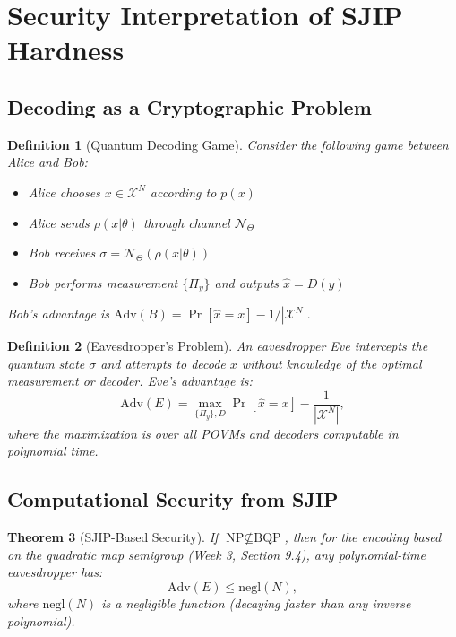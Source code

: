 \documentclass[12pt]{article}
\newtheorem{theorem}{Theorem}[section]
\newtheorem{definition}[theorem]{Definition}
\newcommand{\calN}{\mathcal{N}}
\begin{document}
\section{Security Interpretation of SJIP Hardness}

\subsection{Decoding as a Cryptographic Problem}

\begin{definition}[Quantum Decoding Game]
Consider the following game between Alice and Bob:
\begin{itemize}
    \item Alice chooses \(x \in \mathcal{X}^N\) according to \(p(x)\)
    \item Alice sends \(\rho(x|\theta)\) through channel \(\calN_\Theta\)
    \item Bob receives \(\sigma = \calN_\Theta(\rho(x|\theta))\)
    \item Bob performs measurement \(\{\Pi_y\}\) and outputs \(\hat{x} = D(y)\)
\end{itemize}
Bob's advantage is \(\text{Adv}(B) = \Pr[\hat{x}=x] - 1/|\mathcal{X}^N|\).
\end{definition}

\begin{definition}[Eavesdropper's Problem]
An eavesdropper Eve intercepts the quantum state \(\sigma\) and attempts to decode \(x\) without knowledge of the optimal measurement or decoder. Eve's advantage is:
\begin{equation}
    \text{Adv}(E) = \max_{\{\Pi_y\}, D} \Pr[\hat{x}=x] - \frac{1}{|\mathcal{X}^N|},
\end{equation}
where the maximization is over all POVMs and decoders computable in polynomial time.
\end{definition}

\subsection{Computational Security from SJIP}

\begin{theorem}[SJIP-Based Security]
If \(\text{NP} \nsubseteq \text{BQP}\), then for the encoding based on the quadratic map semigroup (Week 3, Section 9.4), any polynomial-time eavesdropper has:
\begin{equation}
    \text{Adv}(E) \leq \text{negl}(N),
\end{equation}
where \(\text{negl}(N)\) is a negligible function (decaying faster than any inverse polynomial).
\end{theorem}
\end{document}
